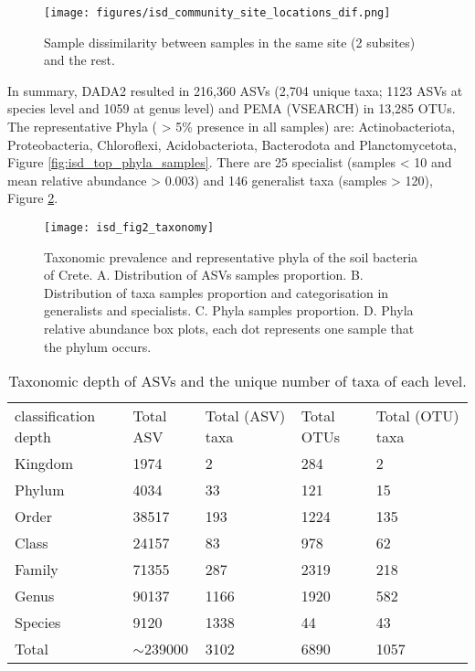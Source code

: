 \begin{figure}[h] 
    \centering\texttt{[image: figures/isd\_community\_site\_locations\_dif.png]}
\caption{Sample dissimilarity between samples in the same site (2 subsites) and the rest.}
    \label{fig:isd_site_locations}
\end{figure}

In summary, DADA2 resulted in 216,360 ASVs (2,704 unique
taxa; 1123 ASVs at species level and 1059 at genus level) and
PEMA (VSEARCH) in 13,285 OTUs.
The representative Phyla ( > 5\% presence in all samples) are:
Actinobacteriota, Proteobacteria, Chloroflexi, Acidobacteriota,
Bacterodota and Planctomycetota, Figure \ref{fig:isd_top_phyla_samples}.
There are 25 specialist (samples < 10 and mean relative
abundance > 0.003) and 146 generalist taxa (samples > 120), Figure \ref{fig:isd_fig2_taxonomy}.

\begin{figure}[hbt!] 
    \centering\texttt{[image: isd\_fig2\_taxonomy]}
    \caption{Taxonomic prevalence and representative phyla of the soil bacteria of Crete. 
    A. Distribution of ASVs samples proportion. B. Distribution of taxa samples
proportion and categorisation in generalists and specialists. C. Phyla samples proportion.
D. Phyla relative abundance box plots, each dot represents one sample that the phylum occurs.}
    \label{fig:isd_fig2_taxonomy}
\end{figure}

\begin{table}[]
    \caption{Taxonomic depth of ASVs and the unique number of taxa of each level.}%
\begin{tabular}{@{}lllll@{}}
classification depth & Total ASV    & Total (ASV) taxa & Total OTUs & Total (OTU) taxa\\
Kingdom              & 1974         & 2                & 284        & 2               \\
Phylum               & 4034         & 33               & 121        & 15              \\
Order                & 38517        & 193              & 1224       & 135             \\
Class                & 24157        & 83               & 978        & 62              \\
Family               & 71355        & 287              & 2319       & 218             \\
Genus                & 90137        & 1166             & 1920       & 582             \\
Species              & 9120         & 1338             & 44         & 43              \\
Total                & $\sim$239000 & 3102             & 6890       & 1057            
\end{tabular}
\label{table:asv_taxonomy}
\end{table}

